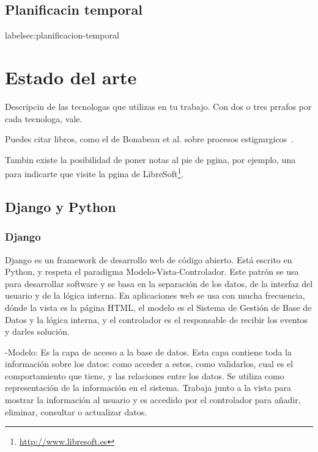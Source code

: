 \documentclass[a4paper, 12pt]{book}
\begin{document}
\section{Planificacin temporal}
label{sec:planificacion-temporal}




\cleardoublepage
\chapter{Estado del arte}

Descripcin de las tecnologas que utilizas en tu trabajo. Con dos o tres prrafos por cada tecnologa, vale.


Puedes citar libros, como el de Bonabeau et al. sobre procesos estigmrgicos~\cite{bonabeau:_swarm}. %

Tambin existe la posibilidad de poner notas al pie de pgina, por ejemplo, 
una para indicarte que visite la pgina de 
LibreSoft\footnote{\url{http://www.libresoft.es}}.

\section{Django y Python} 
\label{sec:djangopython}

\subsection{Django} 
\label{subsec:django}
Django es un framework de desarrollo web de c\'odigo abierto. Est\'a escrito en Python, y respeta el paradigma Modelo-Vista-Controlador. 
Este patr\'on se usa para desarrollar software y se basa en la separaci\'on de los datos, de la interfaz del usuario y de la l\'ogica interna. 
En aplicaciones web se usa con mucha frecuencia, d\'onde la vista es la p\'agina HTML, el modelo es el Sistema de Gesti\'on de Base de Datos y la 
l\'ogica interna, y el controlador es el responsable de recibir los eventos y darles soluci\'on.

-Modelo: Es la capa de acceso a la base de datos. Esta capa contiene toda la informaci\'on sobre los datos: como acceder a estos, como validarlos, 
cual es el comportamiento que tiene, y las relaciones entre los datos. Se utiliza como representaci\'on de la informaci\'on en el sistema. Trabaja junto 
a la vista para mostrar la informaci\'on al usuario y es accedido por el controlador para a\~nadir, eliminar, consultar o actualizar datos. 
     
\end{document}
